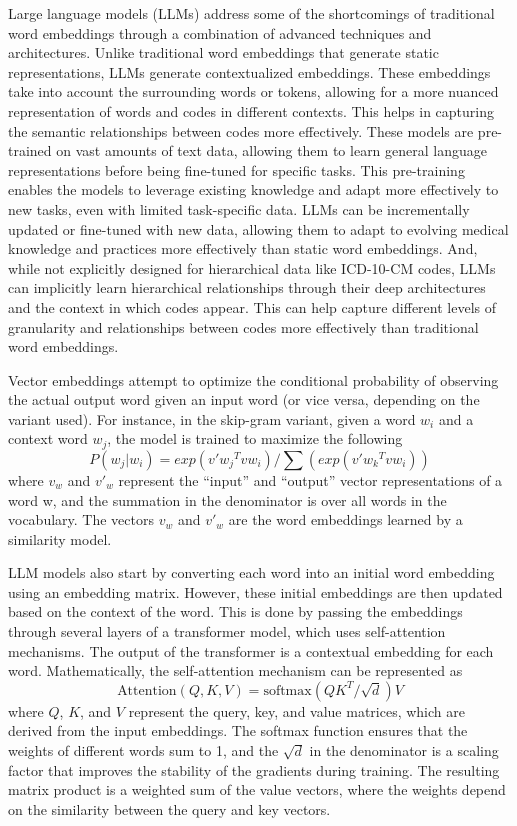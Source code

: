\documentclass{bmcart}
\begin{document}
Large language models (LLMs) address some of the shortcomings of traditional 
word embeddings through a combination of advanced techniques and 
architectures. Unlike traditional word embeddings that generate static 
representations, LLMs generate contextualized embeddings. 
These embeddings take into account the surrounding words or tokens, allowing 
for a more nuanced representation of words and codes in different contexts. 
This helps in capturing the semantic relationships between codes more 
effectively. These models are pre-trained on vast amounts of text data, 
allowing them to learn general language representations before being 
fine-tuned for specific tasks. This pre-training enables the models to 
leverage existing knowledge and adapt more effectively to new tasks, even 
with limited task-specific data. LLMs can be incrementally 
updated or fine-tuned with new data, allowing them to adapt to evolving 
medical knowledge and practices more effectively than static word embeddings. 
And, while not explicitly designed for hierarchical data like ICD-10-CM codes, 
LLMs can implicitly learn hierarchical relationships through 
their deep architectures and the context in which codes appear. This can help 
capture different levels of granularity and relationships between codes more 
effectively than traditional word embeddings.

Vector embeddings attempt to optimize the conditional probability of observing 
the actual output word given an input word (or vice versa, depending on the 
variant used). For instance, in the skip-gram variant, given a word 
$w_i$ and a context word $w_j$, the model is trained to maximize the 
following
\begin{equation*}
P(w_j|w_i) = exp(v'{w_j}^T v{w_i}) / \sum (exp(v'{w_k}^T v{w_i}))
\end{equation*}
where $v_w$ and $v'_w$ represent the ``input'' and ``output'' vector 
representations of a word w, and the summation in the denominator is over 
all words in the vocabulary. The vectors $v_w$ and $v'_w$ are the word 
embeddings learned by a similarity model.

LLM models also start by converting each word into an 
initial word embedding using an embedding matrix. However, these initial 
embeddings are then updated based on the context of the word. This is done by 
passing the embeddings through several layers of a transformer model, which 
uses self-attention mechanisms. The output of the transformer is a contextual 
embedding for each word. Mathematically, the self-attention mechanism can be 
represented as
\begin{equation*}
\text{Attention}(Q, K, V) = \text{softmax}(QK^T/\sqrt{d}) V
\end{equation*}
where $Q$, $K$, and $V$ represent the query, key, and value matrices, which 
are derived from the input embeddings. The softmax function ensures that the 
weights of different words sum to 1, and the $\sqrt{d}$ in the denominator is 
a scaling factor that improves the stability of the gradients during training. 
The resulting matrix product is a weighted sum of the value vectors, where the 
weights depend on the similarity between the query and key vectors.
\end{document}
